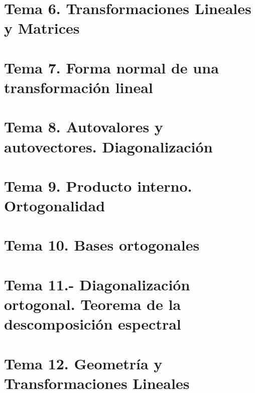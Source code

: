 \documentclass[12pt, twoside, openright]{report} %
\begin{document}
\part{Tema 6. Transformaciones Lineales y Matrices}




\part{Tema 7. Forma normal de una transformación lineal}




\part{Tema 8. Autovalores  y autovectores. Diagonalización}





\part{Tema 9. Producto interno. Ortogonalidad}





\part{Tema 10. Bases ortogonales}




\part{Tema 11.- Diagonalización ortogonal. Teorema de la descomposición espectral}





\part{Tema 12. Geometría y Transformaciones Lineales}



\end{document}
